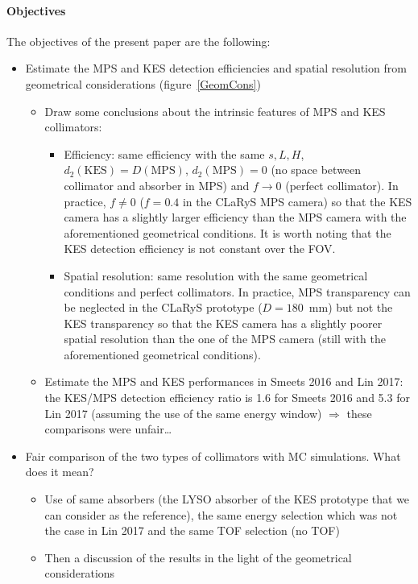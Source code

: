 \documentclass[a4paper,english]{article}
\begin{document}
\paragraph{Objectives}
The objectives of the present paper are the following:

\begin{itemize}
  \item Estimate the MPS and KES detection efficiencies and spatial resolution from geometrical considerations (figure~\ref{GeomCons})
  \begin{itemize}
    \item Draw some conclusions about the intrinsic features of MPS and KES collimators:  
    \begin{itemize}
      \item Efficiency: same efficiency with the same $s, L, H$, $d_2(\text{KES}) = D(\text{MPS})$, $d_2(\text{MPS})=0$ (no space between collimator and absorber in MPS) and $f\longrightarrow0$ (perfect collimator). In practice, $f\ne 0$ ($f=0.4$ in the CLaRyS MPS camera) so that the KES camera has a slightly larger efficiency than the MPS camera with the aforementioned geometrical conditions. It is worth noting that the KES detection efficiency is not constant over the FOV.
      \item Spatial resolution: same resolution with the same geometrical conditions and perfect collimators. In practice, MPS transparency can be neglected in the CLaRyS prototype ($D = 180$~mm) but not the KES transparency so that the KES camera has a slightly poorer spatial resolution than the one of the MPS camera (still with the aforementioned geometrical conditions).
    \end{itemize}
    \item Estimate the MPS and KES performances in Smeets 2016 and Lin 2017: the KES/MPS detection efficiency ratio is 1.6 for Smeets 2016 and 5.3 for Lin 2017 (assuming the use of the same energy window) $\Rightarrow$ these comparisons were unfair\dots    
  \end{itemize}
  \item Fair comparison of the two types of collimators with MC simulations. What does it mean? 
  \begin{itemize}
    \item Use of same absorbers (the LYSO absorber of the KES prototype that we can consider as the reference), the same energy selection which was not the case in Lin 2017 and the same TOF selection (no TOF)
    \item Then a discussion of the results in the light of the geometrical considerations

\end{itemize}
\end{itemize}
\end{document}
